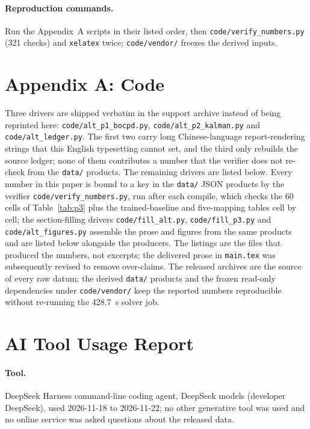 \documentclass{swmcmthesis}
\begin{document}
\paragraph{Reproduction commands.} Run the Appendix~A scripts in their listed order, then \texttt{code/verify\_numbers.py} (321 checks) and \texttt{xelatex} twice; \texttt{code/vendor/} freezes the derived inputs.

\clearpage
{}
\appendix
\section{Appendix A: Code}
Three drivers are shipped verbatim in the support archive instead of being reprinted
here: \texttt{code/alt\_p1\_bocpd.py}, \texttt{code/alt\_p2\_kalman.py} and
\texttt{code/alt\_ledger.py}. The first two carry long Chinese-language report-rendering
strings that this English typesetting cannot set, and the third only rebuilds the source
ledger; none of them contributes a number that the verifier does not re-check from the
\texttt{data/} products. The remaining drivers are listed below.
Every number in this paper is bound to a key in the \texttt{data/} JSON products by the verifier \texttt{code/verify\_numbers.py}, run after each compile, which checks the 60 cells of Table~\ref{tab:p3} plus the trained-baseline and five-mapping tables cell by cell; the section-filling drivers \texttt{code/fill\_alt.py}, \texttt{code/fill\_p3.py} and \texttt{code/alt\_figures.py} assemble the prose and figures from the same products and are listed below alongside the producers. The listings are the files that produced the numbers, not excerpts; the delivered prose in \texttt{main.tex} was subsequently revised to remove over-claims. The released archives are the source of every raw datum; the derived \texttt{data/} products and the frozen read-only dependencies under \texttt{code/vendor/} keep the reported numbers reproducible without re-running the 428.7~s solver job.

\section*{AI Tool Usage Report}\label{app:ai}


\paragraph{Tool.} DeepSeek Harness command-line coding agent, DeepSeek models (developer DeepSeek), used 2026-11-18 to 2026-11-22; no other generative tool was used and no online service was asked questions about the released data.
\end{document}
